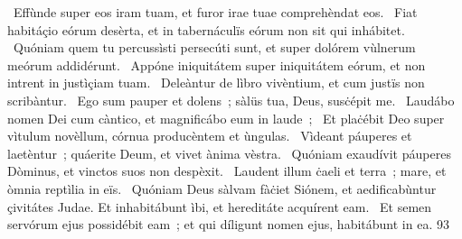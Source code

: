 {~Effùnde super eos iram tuam, et furor irae tuae comprehèndat eos.
~Fiat habitáçio eórum desèrta, et in tabernáculïs eórum non sit qui inhábitet.
~Quóniam quem tu percussìsti persecúti sunt, et super dolórem vùlnerum meórum addidérunt.
~Appóne iniquitátem super iniquitátem eórum, et non intrent in justìçiam tuam.
~Deleàntur de lìbro vivèntium, et cum justïs non scribàntur.
~Ego sum pauper et dolens~; sàlüs tua, Deus, susċépit me.
~Laudábo nomen Dei cum càntico, et magnificábo eum in laude~;
~Et plaċébit Deo super vìtulum novèllum, córnua producèntem et ùngulas.
~Vìdeant páuperes et laetèntur~; quáerite Deum, et vivet ànima vèstra.
~Quóniam exaudívit páuperes Dòminus, et vinctos suos non despèxit.
~Laudent illum ċaeli et terra~; mare, et òmnia reptìlia in eïs.
~Quóniam Deus sàlvam fàċiet Siónem, et aedificabùntur çivitátes Judae. Et inhabitábunt ìbi, et hereditáte acquírent eam.
~Et semen servórum ejus possidébit eam~; et qui díligunt nomen ejus, habitábunt in ea.}
{9}{3}
